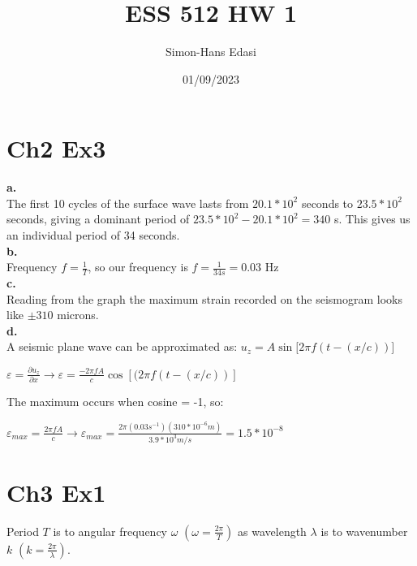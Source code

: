 \documentclass{article}
\title{ESS 512 HW 1}
\date{01/09/2023}
\author{Simon-Hans Edasi}
\begin{document}
	\maketitle



\section{Ch2 Ex3}
\textbf{a.} \\
The first 10 cycles of the surface wave lasts from $20.1 * 10^2$ seconds to $23.5*10^2$ seconds, giving a dominant period of $23.5 * 10^2 - 20.1 * 10^2 = 340$ s. This gives us an individual period of 34 seconds. \\

\textbf{b.} \\
Frequency $f = \frac{1}{T}$, so our frequency is $f = \frac{1}{34s} = 0.03$ Hz \\

\textbf{c.}\\
Reading from the graph the maximum strain recorded on the seismogram looks like $\pm{310}$ microns. \\

\textbf{d.}\\
A seismic plane wave can be approximated as: $u_{z} = A \sin[{2\pi f(t - (x / c))]}$ \\

\begin{center}

$
\varepsilon = \frac{\partial{u_z}}{\partial{x}} \rightarrow \varepsilon = \frac{- 2  \pi f A}{c}\cos \left[(2\pi f \left(t - \left(x / c\right)\right) \right]
$
\end{center}

The maximum occurs when cosine = -1, so:

\begin{center}
$
\varepsilon_{max} = \frac{2  \pi f A}{c} \rightarrow \varepsilon_{max} = \frac{2\pi \left( 0.03 s^{-1}\right)\left( 310 * 10^{-6} m\right)}{3.9 * 10^{3} m/s} = 1.5 * 10^{-8}
$
\end{center}





 



\section{Ch3 Ex1}
Period $T$ is to angular frequency $\omega$ $\left(\omega = \frac{2\pi}{T}\right)$ as wavelength $\lambda$ is to wavenumber $k$ $\left(k = \frac{2\pi}{\lambda}\right)$.
\end{document}
